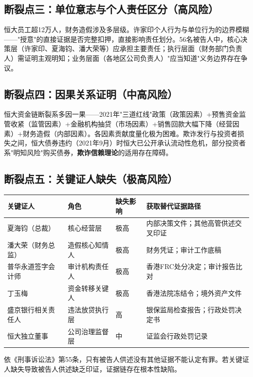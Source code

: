 \documentclass[11pt,a4paper,oneside,openany]{article}
\begin{document}
\subsection{断裂点三：单位意志与个人责任区分（高风险）}
恒大员工超12万人，财务造假涉及多层级。许家印个人行为与单位行为的边界模糊——"授意"的直接证据是否完整扣押，直接影响责任划分。56名被告人中，核心决策层（许家印、夏海钧、潘大荣等）应承担主要责任；执行层面（财务部门负责人）需证明主观明知；业务层面（各地区公司负责人）"应当知道"义务边界存在争议。

\subsection{断裂点四：因果关系证明（中高风险）}
恒大资金链断裂系多因一果——2021年"三道红线"政策（政策因素）+预售资金监管收紧（监管因素）+金融机构抽贷（市场因素）+销售回款大幅下降（经营因素）+财务造假（内部因素）。各因素贡献度量化极为困难。欺诈发行与投资者损失之间，恒大债券违约（2021年9月）时恒大已公开承认流动性危机，部分投资者系"明知风险"购买债券，\textbf{欺诈信赖理论}的适用存在障碍。

\subsection{断裂点五：关键证人缺失（极高风险）}
\begin{threeparttable}
\caption{关键证人缺失风险矩阵}
\begin{tabular}{p{3cm}p{2cm}p{1.3cm}p{4cm}}
\toprule
\textbf{关键证人} & \textbf{角色} & \textbf{缺失影响} & \textbf{获取替代证据路径} \\
\midrule
夏海钧（总裁） & 核心经营层 & \cellcolor{highrisk}极高 & 内部决策文件；其他高管供述交叉印证 \\
潘大荣（财务总监） & 造假核心知情人 & \cellcolor{highrisk}极高 & 财务凭证；审计工作底稿 \\
普华永道签字会计师 & 审计机构责任人 & \cellcolor{highrisk}极高 & 香港FRC处分决定；审计报告比对 \\
丁玉梅 & 资金转移关键人 & \cellcolor{highrisk}极高 & 香港法院冻结令；境外资产文件 \\
盛京银行相关责任人 & 违法放贷执行层 & 高 & 银保监局检查报告；行政处罚决定书 \\
恒大独立董事 & 公司治理监督层 & 中 & 证监会行政处罚记录 \\
\bottomrule
\end{tabular}
\end{threeparttable}

依《刑事诉讼法》第55条，只有被告人供述没有其他证据不能认定有罪。若关键证人缺失导致被告人供述缺乏印证，证据链存在根本性缺陷。
\end{document}
